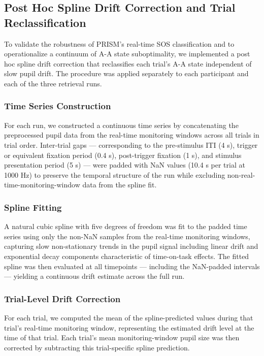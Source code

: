 \subsection{Post Hoc Spline Drift Correction and Trial Reclassification}

To validate the robustness of PRISM's real-time SOS classification and to operationalize a continuum of A-A state suboptimality, we implemented a post hoc spline drift correction that reclassifies each trial's A-A state independent of slow pupil drift. The procedure was applied separately to each participant and each of the three retrieval runs.

\subsubsection{Time Series Construction}

For each run, we constructed a continuous time series by concatenating the preprocessed pupil data from the real-time monitoring windows across all trials in trial order. Inter-trial gaps — corresponding to the pre-stimulus ITI (4 s), trigger or equivalent fixation period (0.4 s), post-trigger fixation (1 s), and stimulus presentation period (5 s) — were padded with NaN values (10.4 s per trial at 1000 Hz) to preserve the temporal structure of the run while excluding non-real-time-monitoring-window data from the spline fit.

\subsubsection{Spline Fitting}

A natural cubic spline with five degrees of freedom was fit to the padded time series using only the non-NaN samples from the real-time monitoring windows, capturing slow non-stationary trends in the pupil signal including linear drift and exponential decay components characteristic of time-on-task effects. The fitted spline was then evaluated at all timepoints — including the NaN-padded intervals — yielding a continuous drift estimate across the full run.

\subsubsection{Trial-Level Drift Correction}

For each trial, we computed the mean of the spline-predicted values during that trial's real-time monitoring window, representing the estimated drift level at the time of that trial. Each trial's mean monitoring-window pupil size was then corrected by subtracting this trial-specific spline prediction.

